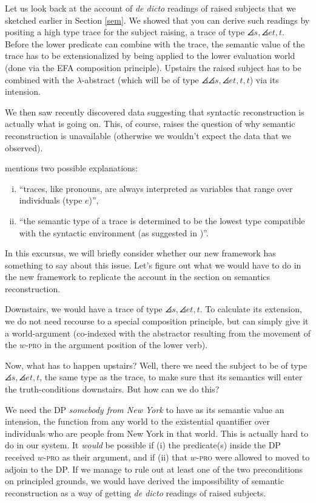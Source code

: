 Let us look back at the account of \emph{de dicto} readings of raised subjects that we sketched earlier
in Section \ref{sem}. We showed that you can derive such readings by positing a high type trace for the subject raising, a trace of type $\angles{s,\angles{et,t}}$. Before the lower predicate can combine with the trace, the semantic value of the trace has to be extensionalized by being applied to the lower evaluation world (done via the EFA composition principle). Upstairs the raised subject has to be combined with the $\lambda$-abstract (which will be of type $\angles{\angles{s,\angles{et,t}},t}$) via its intension.

We then saw recently discovered data suggesting that syntactic reconstruction is actually what is going on. This, of course, raises the question of why semantic reconstruction is unavailable (otherwise we wouldn't expect the data that we observed).

\citet[p. 171, fn. 41]{fox:2000} mentions two possible explanations: 

\begin{enumerate}[(i)] 
  \item ``traces, like pronouns, are always interpreted as variables that range over individuals (type $e$)'', 
  \item ``the semantic type of a trace is determined to be the lowest type compatible with the syntactic environment (as suggested in \citet{beck:diss})''. 
\end{enumerate}
%
In this excursus, we will briefly consider whether our new framework has something to say about this issue. Let's figure out what we would have to do in the new framework to replicate the account in the section on semantics reconstruction.

Downstairs, we would have a trace of type $\angles{s,\angles{et,t}}$. To calculate its extension, we do not need recourse to a special composition principle, but can simply give it a world-argument (co-indexed with the abstractor resulting from the movement of the $w$-\textsc{pro} in the argument position of the lower verb).

Now, what has to happen upstairs? Well, there we need the subject to be of type $\angles{s,\angles{et,t}}$, the same type as the trace, to make sure that its semantics will enter the truth-conditions downstairs. But how can we do this?

We need the DP \emph{somebody from New York} to have as its semantic value an intension, the function from any world to the existential quantifier over individuals who are people from New York in that world. This is actually hard to do in our system. It \emph{would} be possible if (i) the predicate(s) inside the DP received $w$-\textsc{pro} as their argument, and if (ii) that $w$-\textsc{pro} were allowed to moved to adjoin to the DP. If we manage to rule out at least one of the two preconditions on principled grounds, we would have derived the impossibility of semantic reconstruction as a way of getting \emph{de dicto} readings of raised subjects.

